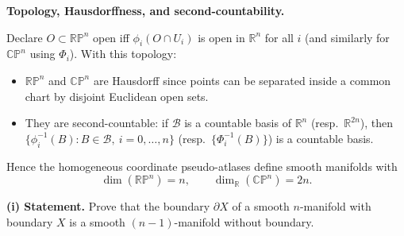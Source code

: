 \begin{solution}
\par\medskip\noindent\textbf{Topology, Hausdorffness, and second-countability.}\par\smallskip

Declare $O\subset\mathbb{RP}^n$ open iff $\phi_i(O\cap U_i)$ is open in $\mathbb R^n$ for all $i$
(and similarly for $\mathbb{CP}^n$ using $\Phi_i$).
With this topology:
\begin{itemize}
	\item $\mathbb{RP}^n$ and $\mathbb{CP}^n$ are Hausdorff since points can be separated inside a common chart by disjoint Euclidean open sets.
	\item They are second-countable: if $\mathcal B$ is a countable basis of $\mathbb R^n$ (resp.\ $\mathbb R^{2n}$), then
	$\{\phi_i^{-1}(B):B\in\mathcal B,\ i=0,\dots,n\}$ (resp.\ $\{\Phi_i^{-1}(B)\}$) is a countable basis.
\end{itemize}
Hence the homogeneous coordinate pseudo-atlases define smooth manifolds with
\[
\dim(\mathbb{RP}^n)=n,
\qquad
\dim_{\mathbb R}(\mathbb{CP}^n)=2n.
\]


\end{solution}

\begin{problem}
\label{prob:cp-vii-0008}
\textbf{(i) Statement.} Prove that the boundary $\partial X$ of a smooth $n$-manifold with boundary $X$
is a smooth $(n-1)$-manifold without boundary.

\medskip
\end{problem}


